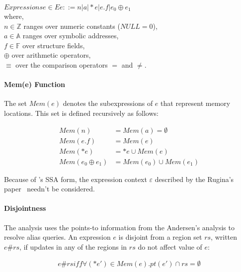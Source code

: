 $Expressions e\in E e::= n | a | *e | e.f | e_0 \oplus e_1 $ \\

where, \\
$n\in \mathbb{Z}$ ranges over numeric constants ($NULL=0$), \\
$a\in \mathbb{A}$ ranges over symbolic addresses, \\
$f\in \mathbb{F}$ over structure fields, \\
$\oplus$ over arithmetic operators, \\
$\equiv$ over the comparison operators $=$ and $\ne$.

\paragraph{Mem(e) Function} 

The set $Mem(e)$ denotes the subexpressions of $e$ that represent memory 
locations. This set is defined recursively as follows:

\begin{align*}
  Mem(n) &= Mem(a)=\emptyset \\
Mem(e.f) &= Mem(e) \\
 Mem(*e) &={*e}\cup Mem(e) \\
Mem(e_0 \oplus e_1) &= Mem(e_0)\cup Mem(e_1)
\end{align*}


Because of \llvm's SSA form, the expression context $\varepsilon$ described 
by the Rugina's paper~\cite{rugina} needn't be considered.

\paragraph{Disjointness}

The analysis uses the points-to information from the Andersen's analysis 
to resolve alias queries. An expression $e$ is disjoint from a region set 
$rs$, written $e\#rs$, if updates in any of the regions in $rs$ do not 
affect value of $e$:

\begin{align*}
e\#rs iff \forall(*e')\in Mem(e). pt(e')\cap rs=\emptyset
\end{align*}



